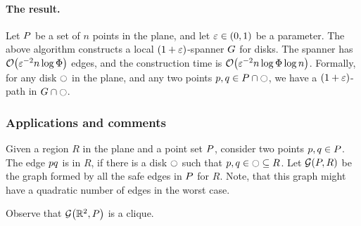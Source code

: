 \documentclass[12pt]{article}%
\begin{document}
\paragraph{The result.}

\begin{theorem}
    Let $P$ be a set of $n$ points in the plane, and let
    $\varepsilon \in (0,1)$ be a parameter. The above algorithm constructs a
    local $(1+\varepsilon)$-spanner $G$ for disks. The spanner has
    $\Of\pth{ \eps^{-2} n\log \spread }$ edges, and the construction time
    is $\Of\pth{ \eps^{-2} n\log \spread \log n }$.  Formally, for any disk
    $\ocircle$ in the plane, and any two points
    $p, q \in P \cap \ocircle$, we have a $(1+\varepsilon)$-path in
    $G \cap {\ocircle}$.
\end{theorem}

\subsubsection{Applications and comments}


\begin{defn}
    Given a region $R$ in the plane and a point set $P$, consider
    two points $p, q \in P$. The edge $p q$ is 
    in $R$, if there is a disk $\ocircle$ such that
    $p,q \in \ocircle \subseteq R$. Let $\GY{\PS}{R}$ be the graph
    formed by all the safe edges in $P$ for $R$. Note, that this
    graph might have a quadratic number of edges in the worst case.
\end{defn}

Observe that $\GY{\Re^2}{\PS}$ is a clique.
\end{document}
